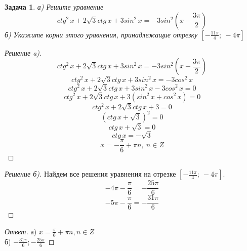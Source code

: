 \documentclass[a4paper,12pt]{article}
\newtheorem{problem}{Задача}
\begin{document}
\newpage
\begin{problem}
а) Решите уравнение
$$ctg^2\,x+2\sqrt{3}ctg\,x+3sin^2\,x=-3sin^2(x-\frac{3\pi}{2})$$
б) Укажите корни этого уравнения, принадлежащие отрезку $\left[-\frac{11\pi}{4};\ -4\pi\right]$
\end{problem}
\newpage
\begin{proof}[Решение a)]
$$ctg^2\,x+2\sqrt{3}ctg\,x+3sin^2\,x=-3sin^2(x-\frac{3\pi}{2})$$
$$ctg^2\,x+2\sqrt{3}ctg\,x+3sin^2\,x=-3cos^2\,x$$
$$ctg^2\,x+2\sqrt{3}ctg\,x+3sin^2\,x-3cos^2\,x=0$$
$$ctg^2\,x+2\sqrt{3}ctg\,x+3(sin^2\,x+cos^2\,x)=0$$
$$ctg^2\,x+2\sqrt{3}ctg\,x+3=0$$
$$(ctg\,x+\sqrt{3})^2=0$$
$$ctg\,x+\sqrt{3}=0$$
$$ctg\,x=-\sqrt{3}$$
$$x=-\frac{\pi}{6}+\pi{}{n},\ n\in{Z}$$
\end{proof}
\begin{proof}[Решение б)]
Найдем все решения уравнения на отрезке $\left[-\frac{11\pi}{4};\ -4\pi\right]$. 
$$-4\pi-\frac{\pi}{6}=-\frac{25\pi}{6}$$
$$-5\pi-\frac{\pi}{6}=-\frac{31\pi}{6}$$
\end{proof}
\begin{proof}[Ответ]
а)	$x=\frac{\pi}{6}+\pi{}n,n\in{}Z$\\ б)	$-\frac{31\pi}{6}; -\frac{25\pi}{6}$
\end{proof}
\end{document}
